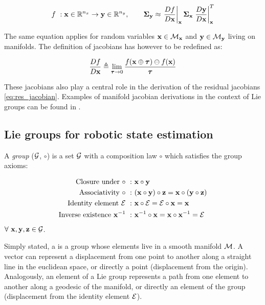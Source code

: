 \begin{equation}
    f~: {\bf x} \in \mathbb{R}^{n_x} \rightarrow {\bf y} \in \mathbb{R}^{n_y}, \quad \quad {\bm \Sigma}_{{\bf y}} \approx 
                \left.\frac{D f}{D {\bf x}} \right|_{{\bf x}}   {\bm \Sigma}_{{\bf x}}    \left.\frac{D {\bf y}}{D {\bf x}}\right|_{{\bf x}}^T
    \label{eq:cov_propagation}
\end{equation}

The same equation applies for random variables ${\bf x} \in \mathcal{M}_{{\bf x}}$ and ${\bf y} \in \mathcal{M}_{{\bf y}}$ living on manifolds. The definition of jacobians has however
to be redefined as:

\begin{equation}
    \frac{D f}{D {\bf x}} \triangleq \lim_{{\bm \tau} \to 0} \frac{f({\bf x} \oplus {\bm \tau}) \ominus f({\bf x})}{{\bm \tau}}
\end{equation}

These jacobians also play a central role in the derivation of the residual jacobians \ref{eq:res_jacobian}.
Examples of manifold jacobian derivations in the context of Lie groups can be found in \cite{sola2018micro}.  



\subsection{Lie groups for robotic state estimation}
A \textit{group} ($\mathcal{G}$, $\circ$) is a set $\mathcal{G}$ with a composition law $\circ$ which satisfies the group axioms:

\begin{align}
    \text{Closure under}~\circ~:&~{\bf x} \circ {\bf y} \\ 
    \text{Associativity}~\circ~:&~({\bf x} \circ {\bf y}) \circ {\bf z} = {\bf x} \circ ({\bf y} \circ {\bf z}) \\ 
    \text{Identity element}~\mathcal{E}~:&~{\bf x} \circ \mathcal{E} = \mathcal{E} \circ {\bf x} = {\bf x} \\ 
    \text{Inverse existence}~{\bf x}^{-1}~:&~{\bf x}^{-1} \circ {\bf x} = {\bf x} \circ {\bf x}^{-1} = \mathcal{E}
\end{align}
$\forall~{\bf x},{\bf y},{\bf z} \in \mathcal{G}$.

Simply stated, a  is a group whose elements live in a smooth manifold $\mathcal{M}$.
A vector can represent a displacement from one point to another along a straight line in the euclidean space, or directly a point (displacement from the origin).
Analogously, an element of a Lie group represents a path from one element to another along a geodesic of the manifold, or directly an element of the group 
(displacement from the identity element $\mathcal{E}$).

